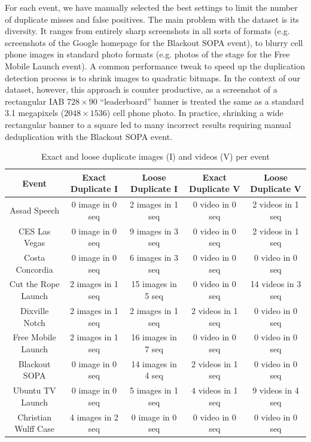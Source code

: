 For each event, we have manually selected the best settings to limit the number of duplicate misses and false positives. The main problem with the dataset is its diversity. It ranges from entirely sharp screenshots in all sorts of formats (e.g. screenshots of the Google homepage for the Blackout SOPA event), to blurry cell phone images in standard photo formats (e.g. photos of the stage for the Free Mobile Launch event). A common performance tweak to speed up the duplication detection process is to shrink images to quadratic bitmaps. In the context of our dataset, however, this approach is counter productive, as a screenshot of a rectangular IAB $728 \times 90$ ``leaderboard'' banner is treated the same as a standard 3.1 megapixels ($2048 \times 1536$) cell phone photo. In practice, shrinking a wide rectangular banner to a square led to many incorrect results requiring manual deduplication with the Blackout SOPA event.

\begin{table}[htbp]
  \begin{tabular}{|c|c|c||c|c|}
    \hline
    \textbf{Event} & \textbf{Exact Duplicate I} & \textbf{Loose Duplicate I} & \textbf{Exact Duplicate V} & \textbf{Loose Duplicate V}\\
    \hline
    Assad Speech & 0 image in 0 seq & 2 images in 1 seq & 0 video in 0 seq & 2 videos in 1 seq\\
    CES Las Vegas & 0 image in 0 seq & 9 images in 3 seq & 0 video in 0 seq & 2 videos in 1 seq\\
    Costa Concordia & 0 image in 0 seq & 6 images in 3 seq & 0 video in 0 seq & 0 video in 0 seq\\
    Cut the Rope Launch & 2 images in 1 seq & 15 images in 5 seq & 0 video in 0 seq & 14 videos in 3 seq\\
    Dixville Notch & 2 images in 1 seq & 2 images in 1 seq & 2 videos in 1 seq & 0 video in 0 seq\\
    Free Mobile Launch & 2 images in 1 seq & 16 images in 7 seq & 0 video in 0 seq & 0 video in 0 seq\\
    Blackout SOPA & 0 image in 0 seq & 14 images in 4 seq & 2 videos in 1 seq & 0 video in 0 seq\\
    Ubuntu TV Launch & 0 image in 0 seq & 5 images in 1 seq & 4 videos in 1 seq & 9 videos in 4 seq\\
    Christian Wulff Case & 4 images in 2 seq & 0 image in 0 seq & 0 video in 0 seq & 0 video in 0 seq\\
    \hline
  \end{tabular}
  \label{tab:duplicate-media}
  \caption{Exact and loose duplicate images (I) and videos (V) per event}
\end{table}

